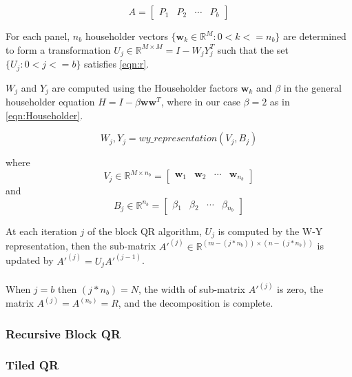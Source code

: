 \documentclass{article}
\begin{document}
\begin{equation}
A = 
\begin{bmatrix}
P_1 & P_2 & \cdots & P_b
\end{bmatrix}
\end{equation}

For each panel, $n_b$ householder vectors $\{\mathbf{w}_k \in \mathbb{R}^M : 0 < k <= n_b\}$ are determined to form a transformation $U_j \in \mathbb{R}^{M\times M} = I - W_jY_j^T$ such that the set $\{U_j : 0 < j <= b\}$ satisfies \eqref{eqn:r}.

$W_j$ and $Y_j$ are computed using the Householder factors $\mathbf{w}_k$ and $\beta{}$ in the general householder equation $H = I - \beta{}\mathbf{w}\mathbf{w}^T$, where in our case $\beta = 2$ as in \eqref{eqn:Householder}.

\begin{equation}
W_j, Y_j = wy\_representation(V_j, B_j)
\end{equation}

where 
\begin{equation}
V_j \in \mathbb{R}^{M \times n_b} =
\begin{bmatrix}
\mathbf{w}_1 & \mathbf{w}_2 & \cdots & \mathbf{w}_{n_b}
\end{bmatrix}
\end{equation}
and
\begin{equation}
B_j \in \mathbb{R}^{n_b} = 
\begin{bmatrix}
\beta{}_1 & \beta{}_2 & \cdots & \beta{}_{n_b}
\end{bmatrix}
\end{equation}

At each iteration $j$ of the block QR algorithm, $U_j$ is computed by the W-Y representation, then the sub-matrix $A'^{(j)} \in \mathbb{R}^{(m - (j * n_b)) \times (n - (j * n_b))}$ is updated by $A'^{(j)} = U_{j}A'^{(j-1)}$.

\paragraph{}
When $j = b$ then $(j * n_b) = N$, the width of sub-matrix $A'^{(j)}$ is zero, the matrix $A^{(j)} = A^{(n_b)} = R$, and the decomposition is complete.

\subsubsection{Recursive Block QR}
\subsubsection{Tiled QR}




\end{document}

